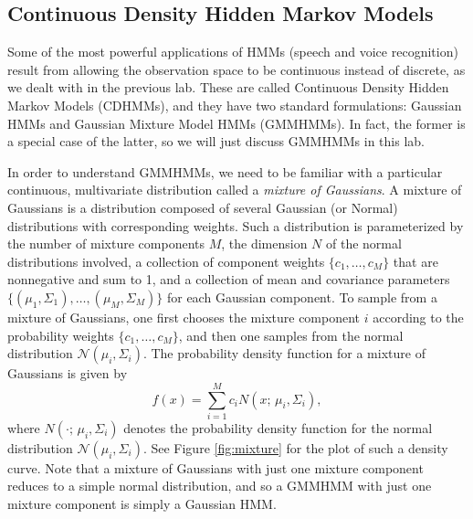 
\subsection{Continuous Density Hidden Markov Models}
Some of the most powerful applications of HMMs (speech and voice recognition) result from allowing the observation space to be continuous instead of discrete, as we dealt with in the previous lab.
These are called Continuous Density Hidden Markov Models (CDHMMs), and they have two standard formulations: Gaussian HMMs and Gaussian Mixture Model HMMs (GMMHMMs).
In fact, the former is a special case of the latter, so we will just discuss GMMHMMs in this lab.

In order to understand GMMHMMs, we need to be familiar with a particular continuous, multivariate distribution called a \emph{mixture of Gaussians}.
A mixture of Gaussians is a distribution composed of several Gaussian (or Normal) distributions with corresponding weights.
Such a distribution is parameterized by the number of mixture components $M$, the dimension $N$ of the normal distributions involved, a collection of component weights
$\{c_1, \ldots, c_M\}$ that are nonnegative and sum to 1, and a collection of mean and covariance parameters $\{(\mu_1,\Sigma_1), \ldots, (\mu_M,\Sigma_M)\}$ for each Gaussian
component. To sample from a mixture of Gaussians, one first chooses the mixture component $i$ according to the probability weights $\{c_1,\ldots,c_M\}$, and then one
samples from the normal distribution $\mathcal{N}(\mu_i, \Sigma_i)$. The probability density function for a mixture of Gaussians is given by
\[
f(x) = \sum_{i=1}^M c_iN(x;\,\mu_i,\Sigma_i),
\]
where $N(\cdot;\,\mu_i,\Sigma_i)$ denotes the probability density function for the normal distribution $\mathcal{N}(\mu_i, \Sigma_i)$.
See Figure \ref{fig:mixture} for the plot of such a density curve.
Note that a mixture of Gaussians with just one mixture component reduces to a simple normal distribution, and so a GMMHMM with just one mixture component
is simply a Gaussian HMM.

